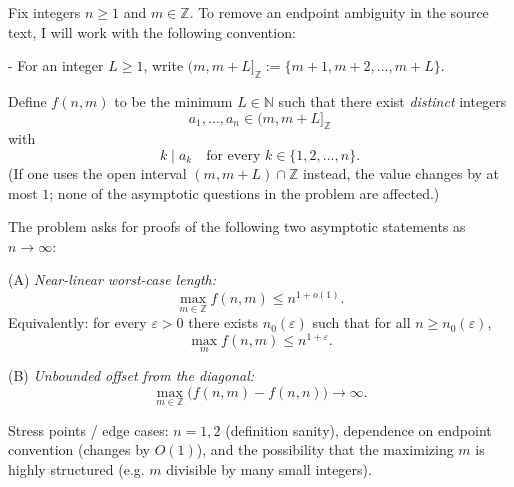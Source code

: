 Fix integers $n\ge 1$ and $m\in\mathbb Z$. To remove an endpoint ambiguity in the source text, I will work with the following convention:

- For an integer $L\ge 1$, write $(m,m+L]_{\mathbb Z}:=\{m+1,m+2,\dots,m+L\}$.

Define $f(n,m)$ to be the minimum $L\in\mathbb N$ such that there exist \emph{distinct} integers
\[
 a_1,\dots,a_n\in (m,m+L]_{\mathbb Z}
\]
with
\[
 k\mid a_k\quad\text{for every }k\in\{1,2,\dots,n\}.
\]
(If one uses the open interval $(m,m+L)\cap\mathbb Z$ instead, the value changes by at most $1$; none of the asymptotic questions in the problem are affected.)

The problem asks for proofs of the following two asymptotic statements as $n\to\infty$:

(A) \emph{Near-linear worst-case length:}
\[
\max_{m\in\mathbb Z} f(n,m) \le n^{1+o(1)}.
\]
Equivalently: for every $\varepsilon>0$ there exists $n_0(\varepsilon)$ such that for all $n\ge n_0(\varepsilon)$,
\[
\max_m f(n,m) \le n^{1+\varepsilon}.
\]

(B) \emph{Unbounded offset from the diagonal:}
\[
\max_{m\in\mathbb Z}\bigl(f(n,m)-f(n,n)\bigr)\to\infty.
\]

Stress points / edge cases: $n=1,2$ (definition sanity), dependence on endpoint convention (changes by $O(1)$), and the possibility that the maximizing $m$ is highly structured (e.g. $m$ divisible by many small integers).
